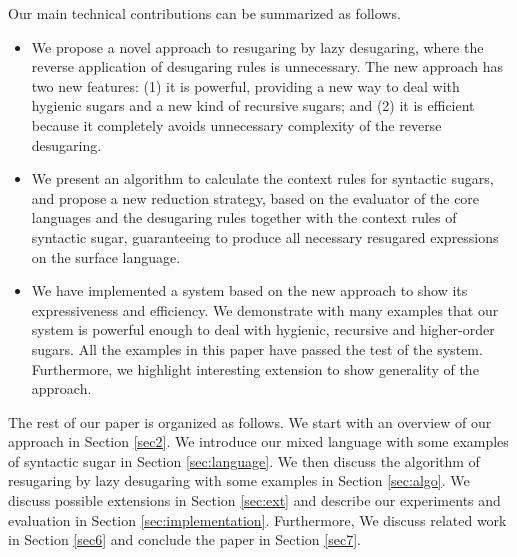 Our main technical contributions can be summarized as follows.
\begin{itemize}
\item We propose a novel approach to resugaring by lazy desugaring, where the reverse application of desugaring rules is unnecessary. The new approach has two new features: (1) it is powerful, providing a new way to deal with hygienic sugars and a new kind of recursive sugars; and (2) it is efficient because it completely avoids unnecessary complexity of the reverse desugaring.

\item We present an algorithm to calculate the context rules for syntactic sugars, and propose a new reduction strategy, based on the evaluator of the core languages and the desugaring rules together with the context rules of syntactic sugar, guaranteeing to produce all necessary resugared expressions on the surface language.

\item We have implemented a system based on the new approach to show its expressiveness and efficiency. We demonstrate with many examples that our system is powerful enough to deal with hygienic, recursive and higher-order sugars. All the examples in this paper have passed the test of the system. Furthermore, we highlight interesting extension to show generality of the approach.


\end{itemize}

The rest of our paper is organized as follows. We start with an overview of our approach in Section \ref{sec2}. We introduce our mixed language with some examples of syntactic sugar in Section \ref{sec:language}. We then discuss the algorithm of resugaring by lazy desugaring with some examples in Section \ref{sec:algo}. We discuss possible extensions in Section \ref{sec:ext} and describe our experiments and evaluation in Section \ref{sec:implementation}. Furthermore,  We discuss related work in Section \ref{sec6} and conclude the paper in Section \ref{sec7}.

